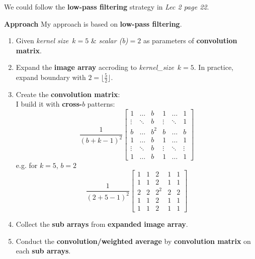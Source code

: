 We could follow the \textbf{low-pass filtering} strategy in \textit{Lec 2 page 22}.

\textbf{Approach}
My approach is based on \textbf{low-pass filtering}.
\begin{enumerate}
    \item Given \emph{kernel size}~\(k=5\) \& \emph{scalar (b)}\(=2\) as parameters of \textbf{convolution matrix}.
    \item Expand the \textbf{image array} accroding to \emph{kernel\_size}~\(k=5\). In practice, expand boundary with \(2=\lfloor \frac{5}{2} \rfloor\).
    \item Create the \textbf{convolution matrix}:\\
    I build it with \textbf{cross-}\(b\) patterns:
    \begin{equation}
      \frac{1}{(b + k - 1)^{2}}
      \begin{bmatrix}
        1 & \dots & b & 1 & \dots & 1 \\
        \vdots & \ddots & b & \vdots & \ddots & 1 \\
        b & \dots & b^{2} & b & \dots & b \\
        1 & \dots & b & 1 & \dots & 1 \\
        \vdots & \ddots & b & \vdots & \ddots & \vdots \\
        1 & \dots & b & 1 & \dots & 1
      \end{bmatrix}
    \end{equation}
    e.g. for $k=5$, $b=2$
    \begin{equation}
      \frac{1}{(2 + 5 - 1)^{2}}
      \begin{bmatrix}
        1 & 1 & 2 & 1 & 1 \\
        1 & 1 & 2 & 1 & 1 \\
        2 & 2 & 2^{2} & 2 & 2 \\
        1 & 1 & 2 & 1 & 1 \\
        1 & 1 & 2 & 1 & 1
      \end{bmatrix}
    \end{equation}
    \item Collect the \textbf{sub arrays} from \textbf{expanded image array}.
    \item Conduct the \textbf{convolution/weighted average} by \textbf{convolution matrix} on each \textbf{sub arrays}.
\end{enumerate}

